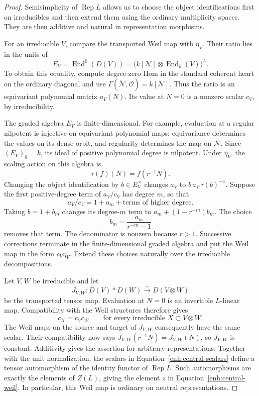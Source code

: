 \documentclass[11pt]{article}
\numberwithin{equation}{section}
\theoremstyle{definition}
\theoremstyle{remark}
\newcommand{\cO}{\mathcal O}
\newcommand{\cN}{\mathcal N}
\newcommand{\End}{\operatorname{End}}
\newcommand{\Rep}{\operatorname{Rep}}
\begin{document}
\begin{proof}
Semisimplicity of $\Rep L$ allows us to choose the object
identifications first on irreducibles and then extend them using the
ordinary multiplicity spaces.  They are then additive and natural in
representation morphisms.

For an irreducible $V$, compare the transported Weil map with
$\eta_V$.  Their ratio lies in the units of
\begin{equation}\label{enh:polynomial-endomorphisms}
 E_V=\End^0(D(V))
     =\bigl(k[\cN]\otimes\End_k(V)\bigr)^L.
\end{equation}
To obtain this equality, compute degree-zero Hom in the standard
coherent heart on the ordinary diagonal and use
$\Gamma(\widetilde{\cN},\cO)=k[\cN]$.
Thus the ratio is an equivariant polynomial matrix $a_V(N)$.
Its value at $N=0$ is a nonzero scalar $c_V$, by irreducibility.

The graded algebra $E_V$ is finite-dimensional.  For example,
evaluation at a regular nilpotent is injective on equivariant
polynomial maps: equivariance determines the values on its dense
orbit, and regularity determines the map on $\cN$.  Since
$(E_V)_0=k$, its ideal of positive polynomial degree is nilpotent.
Under $\eta_V$, the scaling action on this algebra is
\[
 \tau(f)(N)=f(r^{-1}N).
\]
Changing the object identification by $b\in E_V^\times$ changes
$a_V$ to $b\,a_V\,\tau(b)^{-1}$.
Suppose the first positive-degree term of $a_V/c_V$ has degree $m$,
so that
\[
 a_V/c_V=1+a_m+\text{terms of higher degree}.
\]
Taking $b=1+b_m$ changes its degree-$m$ term to
$a_m+(1-r^{-m})b_m$.  The choice
\[
 b_m=\frac{a_m}{r^{-m}-1}
\]
removes that term.  The denominator is nonzero because $r>1$.
Successive corrections terminate in the finite-dimensional graded
algebra and put the Weil map in the form $c_V\eta_V$.
Extend these choices naturally over the irreducible decompositions.

Let $V,W$ be irreducible and let
\[
 J_{V,W}:D(V)*D(W)\xrightarrow{\sim}D(V\otimes W)
\]
be the transported tensor map.  Evaluation at $N=0$ is an invertible
$L$-linear map.  Compatibility with the Weil structures therefore gives
\begin{equation}\label{enh:central-scalars}
 c_X=c_Vc_W
 \qquad\text{for every irreducible }X\subset V\otimes W.
\end{equation}
The Weil maps on the source and target of $J_{V,W}$ consequently
have the same scalar.  Their compatibility now says
$J_{V,W}(r^{-1}N)=J_{V,W}(N)$, so $J_{V,W}$ is constant.
Additivity gives the assertion for arbitrary representations.
Together with the unit normalization, the scalars in
Equation~\eqref{enh:central-scalars} define a tensor automorphism of
the identity functor of $\Rep L$.  Such automorphisms are exactly
the elements of $Z(L)$, giving the element $z$ in
Equation~\eqref{enh:central-weil}.  In particular, this Weil map is
ordinary on neutral representations.


\end{proof}
\end{document}
